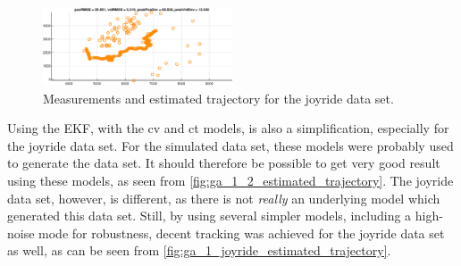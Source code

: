 \begin{figure}[ht]
    \centering
    \includegraphics[width=0.5\textwidth]{figures/ga_1/joyride_measurements_and_estimated_trajectory} 
    \caption{Measurements and estimated trajectory for the joyride data set. }
    \label{fig:ga_1_joyride_measurements_and_estimated_trajectory}
\end{figure}


Using the EKF, with the \acrshort{cv} and \acrshort{ct} models, is also a simplification, especially for the joyride data set. For the simulated data set, these models were probably used to generate the data set. It should therefore be possible to get very good result using these models, as seen from \cref{fig:ga_1_2_estimated_trajectory}. The joyride data set, however, is different, as there is not \textit{really} an underlying model which generated this data set. Still, by using several simpler models, including a high-noise mode for robustness, decent tracking was achieved for the joyride data set as well, as can be seen from \cref{fig:ga_1_joyride_estimated_trajectory}. 






